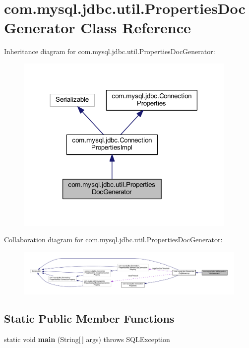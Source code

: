\hypertarget{classcom_1_1mysql_1_1jdbc_1_1util_1_1_properties_doc_generator}{}\section{com.\+mysql.\+jdbc.\+util.\+Properties\+Doc\+Generator Class Reference}
\label{classcom_1_1mysql_1_1jdbc_1_1util_1_1_properties_doc_generator}


Inheritance diagram for com.\+mysql.\+jdbc.\+util.\+Properties\+Doc\+Generator\+:
\nopagebreak
\begin{figure}[H]
\begin{center}
\leavevmode
\includegraphics[width=302pt]{classcom_1_1mysql_1_1jdbc_1_1util_1_1_properties_doc_generator__inherit__graph}
\end{center}
\end{figure}


Collaboration diagram for com.\+mysql.\+jdbc.\+util.\+Properties\+Doc\+Generator\+:
\nopagebreak
\begin{figure}[H]
\begin{center}
\leavevmode
\includegraphics[width=350pt]{classcom_1_1mysql_1_1jdbc_1_1util_1_1_properties_doc_generator__coll__graph}
\end{center}
\end{figure}
\subsection*{Static Public Member Functions}
\begin{DoxyCompactItemize}
\item 
\mbox{\label{classcom_1_1mysql_1_1jdbc_1_1util_1_1_properties_doc_generator_a271a9c55779379e07a40d716934afd24}} 
static void {\bfseries main} (String\mbox{[}$\,$\mbox{]} args)  throws S\+Q\+L\+Exception 
\end{DoxyCompactItemize}
